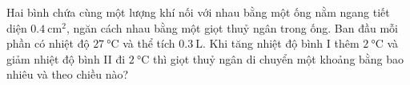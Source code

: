 \begin{ex}
Hai bình chứa cùng một lượng khí nối với nhau bằng một ống nằm ngang tiết diện $\SI{0.4}{\centi\meter^2}$, ngăn cách nhau bằng một giọt thuỷ ngân trong ống. Ban đầu mỗi phần có nhiệt độ $\SI{27}{\celsius}$ và thể tích $\SI{0.3}{\liter}$. Khi tăng nhiệt độ bình I thêm $\SI{2}{\celsius}$ và giảm nhiệt độ bình II đi $\SI{2}{\celsius}$ thì giọt thuỷ ngân di chuyển một khoảng bằng bao nhiêu và theo chiều nào?
	
\end{ex}